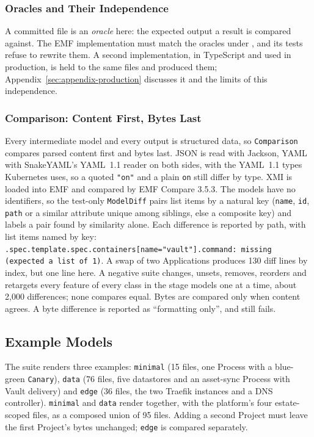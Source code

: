 \subsubsection{Oracles and Their Independence}
\label{sec:oracles}

A committed file is an \emph{oracle} here: the expected output a result is compared
against. The EMF implementation must match the oracles under ,
and its tests refuse to rewrite them. A second implementation, in TypeScript and used
in production, is held to the same files and produced them;
Appendix~\ref{sec:appendix-production} discusses it and the limits of this independence.

\subsubsection{Comparison: Content First, Bytes Last}
\label{sec:compare-alt}

Every intermediate model and every output is structured data, so \texttt{Comparison}
compares parsed content first and bytes last. JSON is read with Jackson, YAML with SnakeYAML's YAML~1.1 reader on both sides, with the YAML~1.1 types Kubernetes uses, so a quoted
\texttt{"on"} and a plain \texttt{on} still differ by type. XMI is loaded into EMF and
compared by EMF Compare 3.5.3. The models have no identifiers, so the test-only
\texttt{ModelDiff} pairs list items by a natural key (\texttt{name}, \texttt{id},
\texttt{path} or a similar attribute unique among siblings, else a composite key) and
labels a pair found by similarity alone. Each difference is reported by path, with list items named by key:
\texttt{.spec.template.spec.containers[name="vault"].command: missing (expected a list of 1)}.
A swap of two Applications produces 130 diff lines by index, but one line here. A
negative suite changes, unsets, removes, reorders and retargets every feature of every
class in the stage models one at a time, about 2,000 differences; none compares equal.
Bytes are compared only when content agrees. A byte difference is reported as
``formatting only'', and still fails.

\subsection{Example Models}
\label{sec:source-models}

The suite renders three examples: \texttt{minimal} (15 files, one Process with a blue-green \texttt{Canary}), \texttt{data} (76 files, five datastores and an asset-sync Process with Vault delivery) and \texttt{edge} (36 files, the two Traefik instances and a DNS controller). \texttt{minimal} and \texttt{data} render together, with the platform's four estate-scoped files,
as a composed union of 95 files. Adding a second Project must leave the first Project's bytes unchanged; \texttt{edge} is compared separately.

